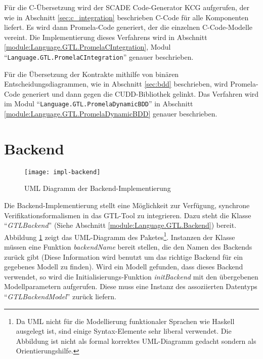 Für die C-Übersetzung wird der SCADE Code-Generator KCG aufgerufen, der wie in Abschnitt \ref{sec:c_integration} beschrieben C-Code für alle Komponenten liefert.
Es wird dann Promela-Code generiert, der die einzelnen C-Code-Modelle vereint.
Die Implementierung dieses Verfahrens wird in Abschnitt \ref{module:Language.GTL.PromelaCIntegration}, Modul "`\verb|Language.GTL.PromelaCIntegration|"' genauer beschrieben.

Für die Übersetzung der Kontrakte mithilfe von binären Entscheidungsdiagrammen, wie in Abschnitt \ref{sec:bdd} beschrieben, wird Promela-Code generiert und dann gegen die CUDD-Bibliothek gelinkt.
Das Verfahren wird im Modul "`\verb|Language.GTL.PromelaDynamicBDD|"' in Abschnitt \ref{module:Language.GTL.PromelaDynamicBDD} genauer beschrieben.
\section{Backend}
\begin{figure}
  \centering
  \texttt{[image: impl-backend]}
  \caption{UML Diagramm der Backend-Implementierung}
  \label{fig:backend-uml}
\end{figure}
Die Backend-Implementierung stellt eine Möglichkeit zur Verfügung, synchrone Verifikationsformalismen in das GTL-Tool zu integrieren.
Dazu steht die Klasse "`\emph{GTLBackend}"' (Siehe Abschnitt \ref{module:Language.GTL.Backend}) bereit.
Abbildung \ref{fig:backend-uml} zeigt das UML-Diagramm des Paketes\footnote{Da UML nicht für die Modellierung funktionaler Sprachen wie Haskell ausgelegt ist, sind einige Syntax-Elemente sehr liberal verwendet. Die Abbildung ist nicht als formal korrektes UML-Diagramm gedacht sondern als Orientierungshilfe.}.
Instanzen der Klasse müssen eine Funktion \emph{backendName} bereit stellen, die den Namen des Backends zurück gibt (Diese Information wird benutzt um das richtige Backend für ein gegebenes Modell zu finden).
Wird ein Modell gefunden, dass dieses Backend verwendet, so wird die Initialisierungs-Funktion \emph{initBackend} mit den übergebenen Modellparametern aufgerufen.
Diese muss eine Instanz des assoziierten Datentyps "`\emph{GTLBackendModel}"' zurück liefern.

